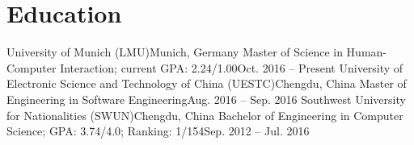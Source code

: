\section{\textbf{Education}}
  \resumeSubHeadingListStart
    \resumeSubheading
      {University of Munich (LMU)}{Munich, Germany}
      {Master of Science in Human-Computer Interaction; current GPA: 2.24/1.00}{Oct. 2016 -- Present}
    \resumeSubheading
      {University of Electronic Science and Technology of China (UESTC)}{Chengdu, China}
      {Master of Engineering in Software Engineering}{Aug. 2016 -- Sep. 2016}
    \resumeSubheading
      {Southwest University for Nationalities (SWUN)}{Chengdu, China}
      {Bachelor of Engineering in Computer Science;  GPA: 3.74/4.0; Ranking: 1/154}{Sep. 2012 -- Jul. 2016}
  \resumeSubHeadingListEnd